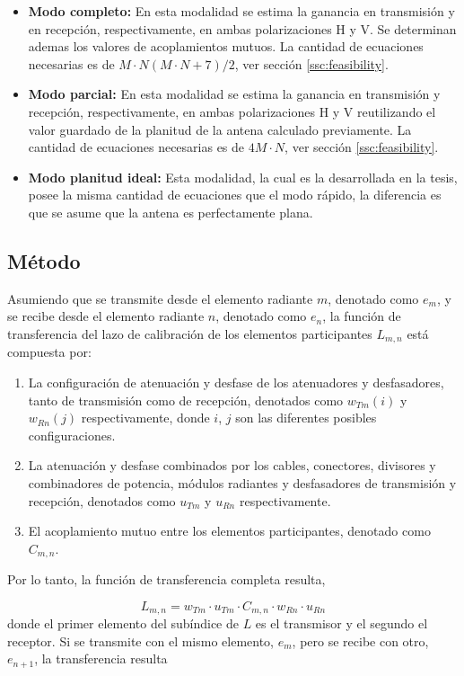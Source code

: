 \begin{itemize}
	\item \textbf{Modo completo:} En esta modalidad se estima la ganancia en transmisión y en recepción, respectivamente, en ambas
		polarizaciones H y V. Se determinan ademas los valores de acoplamientos mutuos. La cantidad de ecuaciones necesarias es de
		$M\cdot N(M\cdot N + 7)/2$, ver sección \ref{ssc:feasibility}.
	\item \textbf{Modo parcial:} En esta modalidad se estima la ganancia en transmisión y recepción, respectivamente, en ambas
		polarizaciones H y V reutilizando el valor guardado de la planitud de la antena calculado previamente. La cantidad de
		ecuaciones necesarias es de $4M\cdot N$, ver sección \ref{ssc:feasibility}.
	\item \textbf{Modo planitud ideal:} Esta modalidad, la cual es la desarrollada en la tesis, posee la misma cantidad de
		ecuaciones que el modo rápido, la diferencia es que se asume que la antena es perfectamente plana.
\end{itemize}


\subsection{Método}

Asumiendo que se transmite desde el elemento radiante $m$, denotado como $e_m$, y se recibe desde el elemento radiante $n$,
denotado como $e_n$, la función de transferencia del lazo de calibración de los elementos participantes $L_{m,n}$ está
compuesta por:

\begin{enumerate}
	\item La configuración de atenuación y desfase de los atenuadores y desfasadores, tanto de transmisión como de recepción,
		denotados como $w_{Tm}(i)$ y $w_{Rn}(j)$ respectivamente, donde $i$, $j$ son las diferentes posibles configuraciones.
	\item La atenuación y desfase combinados por los cables, conectores, divisores y combinadores de potencia, módulos radiantes
		y desfasadores de transmisión y recepción, denotados como $u_{Tm}$ y $u_{Rn}$ respectivamente.
	\item El acoplamiento mutuo entre los elementos participantes, denotado como $C_{m, n}$.
\end{enumerate}

Por lo tanto, la función de transferencia completa resulta,

\begin{equation}
	L_{m,n} = w_{Tm} \cdot u_{Tm} \cdot C_{m,n} \cdot w_{Rn} \cdot u_{Rn}
	\label{eq:transfer_mn}
\end{equation}
donde el primer elemento del subíndice de $L$ es el transmisor y el segundo el receptor. Si se transmite con el mismo elemento,
$e_m$, pero se recibe con otro, $e_{n + 1}$, la transferencia resulta


